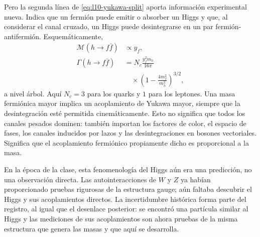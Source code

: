 Pero la segunda línea de \eqref{eq:l10-yukawa-split} aporta información experimental nueva. Indica que un fermión puede emitir o absorber un Higgs y que, al considerar el canal cruzado, un Higgs puede desintegrarse en un par fermión-antifermión. Esquemáticamente,
\begin{equation}
\begin{aligned}
  \mathcal M(h\to f\bar f)&\propto y_f,
  \\
  \Gamma(h\to f\bar f)
  &=
  N_c\frac{y_f^2m_h}{16\pi}
  \\
  &\quad\times
  \left(1-\frac{4m_f^2}{m_h^2}\right)^{3/2},
\end{aligned}
  \label{eq:l10-higgs-fermion-width}
\end{equation}
a nivel árbol. Aquí \(N_c=3\) para los quarks y \(1\) para los leptones. Una masa fermiónica mayor implica un acoplamiento de Yukawa mayor, siempre que la desintegración esté permitida cinemáticamente. Esto no significa que todos los canales pesados dominen: también importan los factores de color, el espacio de fases, los canales inducidos por lazos y las desintegraciones en bosones vectoriales. Significa que el acoplamiento fermiónico propiamente dicho es proporcional a la masa.

\begin{classroomqa}
\end{classroomqa}

En la época de la clase, esta fenomenología del Higgs aún era una predicción, no una observación directa. Las autointeracciones de \(W\) y \(Z\) ya habían proporcionado pruebas rigurosas de la estructura gauge; aún faltaba descubrir el Higgs y sus acoplamientos directos. La incertidumbre histórica forma parte del registro, al igual que el desenlace posterior: se encontró una partícula similar al Higgs y las mediciones de sus acoplamientos son ahora pruebas de la misma estructura que genera las masas y que aquí se desarrolla.

